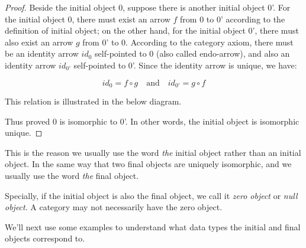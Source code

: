 \documentclass[b5paper]{article}
\begin{document}
\begin{proof}
Beside the initial object 0, suppose there is another initial object 0'. For the initial object 0, there must exist an arrow $f$ from 0 to 0' according to the definition of initial object; on the other hand, for the initial object 0', there must also exist an arrow $g$ from 0' to 0. According to the category axiom, there must be an identity arrow $id_0$ self-pointed to 0 (also called endo-arrow), and also an identity arrow $id_{0'}$ self-pointed to 0'. Since the identity arrow is unique, we have:

\[
  id_0 = f \circ g \quad \text{and} \quad id_{0'} = g \circ f
\]

This relation is illustrated in the below diagram.

\begin{center}
\end{center}

Thus proved 0 is isomorphic to 0'. In other words, the initial object is isomorphic unique.
\end{proof}

This is the reason we usually use the word {\em the} initial object rather than an initial object. In the same way that two final objects are uniquely isomorphic, and we usually use the word {\em the} final object.

Specially, if the initial object is also the final object, we call it {\em zero object} or {\em null object}. A category may not necessarily have the zero object.

We'll next use some examples to understand what data types the initial and final objects correspond to.
\end{document}
